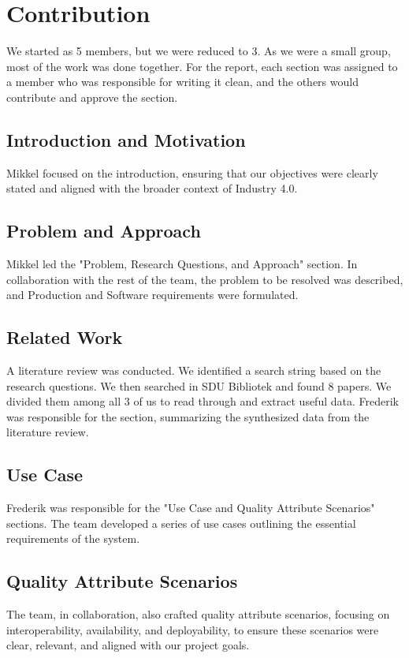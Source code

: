 \documentclass[conference]{IEEEtran}
\begin{document}
\maketitle
\IEEEpubidadjcol


\section{Contribution}

We started as 5 members, but we were reduced to 3. As we were a small group, most of the work was done together.
For the report, each section was assigned to a member who was responsible for writing it clean, and the others would contribute and approve the section.

\subsection{Introduction and Motivation}
Mikkel focused on the introduction, ensuring that our objectives were clearly stated and aligned with the broader context of Industry 4.0. 


\subsection{Problem and Approach}

Mikkel led the "Problem, Research Questions, and Approach" section. In collaboration with the rest of the team, the problem to be resolved was described, and Production and Software requirements were formulated. 

\subsection{Related Work}

A literature review was conducted. We identified a search string based on the research questions. We then searched in SDU Bibliotek and found 8 papers. We divided them among all 3 of us to read through and extract useful data.
Frederik was responsible for the section, summarizing the synthesized data from the literature review.

\subsection{Use Case}
Frederik was responsible for the "Use Case and Quality Attribute Scenarios" sections. The team developed a series of use cases outlining the essential requirements of the system. 
\subsection{Quality Attribute Scenarios}
The team, in collaboration, also crafted quality attribute scenarios, focusing on interoperability, availability, and deployability, to ensure these scenarios were clear, relevant, and aligned with our project goals.
\end{document}
